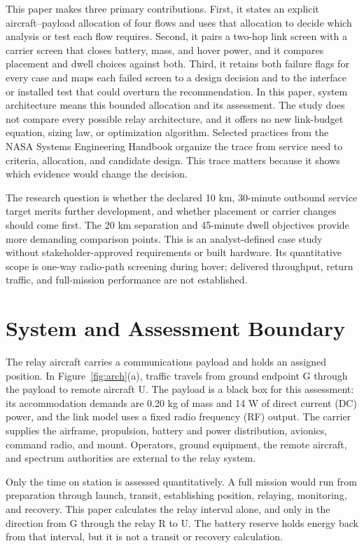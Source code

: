 \documentclass[twocolumn,letterpaper]{IEEEAerospaceCLS}
\begin{document}
This paper makes three primary contributions. First, it states an explicit aircraft--payload allocation of four flows and uses that allocation to decide which analysis or test each flow requires. Second, it pairs a two-hop link screen with a carrier screen that closes battery, mass, and hover power, and it compares placement and dwell choices against both. Third, it retains both failure flags for every case and maps each failed screen to a design decision and to the interface or installed test that could overturn the recommendation. In this paper, system architecture means this bounded allocation and its assessment. The study does not compare every possible relay architecture, and it offers no new link-budget equation, sizing law, or optimization algorithm. Selected practices from the NASA Systems Engineering Handbook \cite{nasaSEH} organize the trace from service need to criteria, allocation, and candidate design. This trace matters because it shows which evidence would change the decision.

The research question is whether the declared 10 km, 30-minute outbound service target merits further development, and whether placement or carrier changes should come first. The 20 km separation and 45-minute dwell objectives provide more demanding comparison points. This is an analyst-defined case study without stakeholder-approved requirements or built hardware. Its quantitative scope is one-way radio-path screening during hover; delivered throughput, return traffic, and full-mission performance are not established.

\section{System and Assessment Boundary}\label{sec:arch}

The relay aircraft carries a communications payload and holds an assigned position. In Figure~\ref{fig:arch}(a), traffic travels from ground endpoint G through the payload to remote aircraft U. The payload is a black box for this assessment: its accommodation demands are 0.20 kg of mass and 14 W of direct current (DC) power, and the link model uses a fixed radio frequency (RF) output. The carrier supplies the airframe, propulsion, battery and power distribution, avionics, command radio, and mount. Operators, ground equipment, the remote aircraft, and spectrum authorities are external to the relay system.

Only the time on station is assessed quantitatively. A full mission would run from preparation through launch, transit, establishing position, relaying, monitoring, and recovery. This paper calculates the relay interval alone, and only in the direction from G through the relay R to U. The battery reserve holds energy back from that interval, but it is not a transit or recovery calculation.
\end{document}
